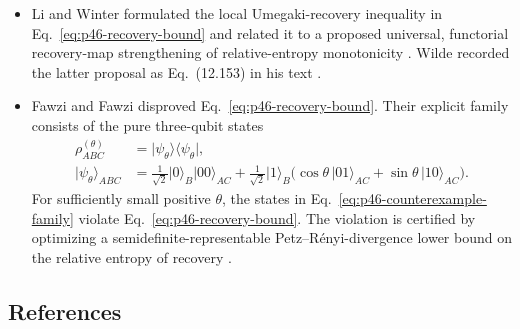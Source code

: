 \begin{itemize}
  \item Li and Winter formulated the local Umegaki-recovery inequality in
  Eq.~\eqref{eq:p46-recovery-bound} and related it to a proposed universal,
  functorial recovery-map strengthening of relative-entropy monotonicity
  .  Wilde recorded the latter proposal as
  Eq.~(12.153) in his text .

  \item Fawzi and Fawzi disproved Eq.~\eqref{eq:p46-recovery-bound}.  Their
  explicit family consists of the pure three-qubit states
  \begin{equation}
    \begin{aligned}
      \rho^{(\theta)}_{ABC}
      &=\lvert\psi_\theta\rangle\!\langle\psi_\theta\rvert,\\
      \lvert\psi_\theta\rangle_{ABC}
      &=\frac{1}{\sqrt2}\lvert0\rangle_B\lvert00\rangle_{AC}
        +\frac{1}{\sqrt2}\lvert1\rangle_B
        \bigl(\cos\theta\,\lvert01\rangle_{AC}
              +\sin\theta\,\lvert10\rangle_{AC}\bigr).
    \end{aligned}
    \label{eq:p46-counterexample-family}
  \end{equation}
  For sufficiently small positive $\theta$, the states in
  Eq.~\eqref{eq:p46-counterexample-family} violate
  Eq.~\eqref{eq:p46-recovery-bound}.  The violation is certified by optimizing
  a semidefinite-representable Petz--R\'enyi-divergence lower bound on the
  relative entropy of recovery .
\end{itemize}

\subsection*{References}

